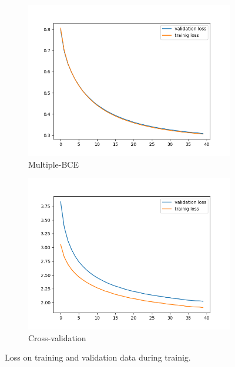 \documentclass[a4paper]{article}
\begin{document}
\begin{figure}[h]
	\centering
	\begin{subfigure}{\textwidth}
		\centering
		\includegraphics[width=.6\linewidth]{images/mbce_loss.png}
		\caption{Multiple-BCE}
	\end{subfigure}
	\begin{subfigure}{\textwidth}
		\centering
		\includegraphics[width=.6\linewidth]{images/simple_loss.png}
		\caption{Cross-validation}
	\end{subfigure}
	
	\caption{Loss on training and validation data during trainig.}
	\label{fig:mbce_loss}
\end{figure}
\end{document}
